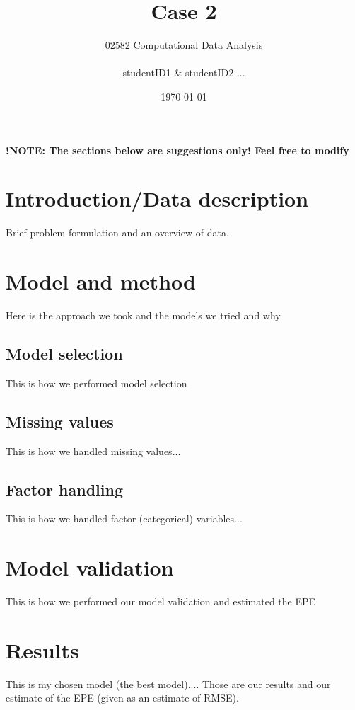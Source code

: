 \documentclass{article}
\title{Case 2}
\author{02582 Computational Data Analysis \\ \\ studentID1 \& studentID2 ...}
\date{\today}
\begin{document}
\maketitle
\textbf{!NOTE: The sections below are suggestions only! Feel free to modify}
\section*{Introduction/Data description}
Brief problem formulation and an overview of data.
\section*{Model and method}
Here is the approach we took and the models we tried and why

\subsection*{Model selection}
This is how we performed model selection
\subsection*{Missing values}
This is how we handled missing values...
\subsection*{Factor handling}
This is how we handled factor (categorical) variables...

\section*{Model validation}
This is how we performed our model validation and estimated the EPE

\section*{Results}
This is my chosen model (the best model)....
Those are our results and our estimate of the EPE (given as
an estimate of RMSE).
\end{document}
